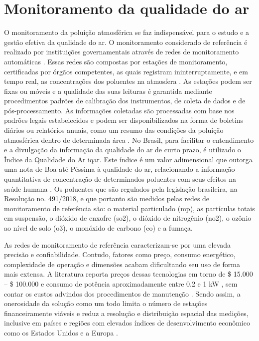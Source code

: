 \chapter{Monitoramento da qualidade do ar}\label{cap:air-quality-monitoring}

O monitoramento da poluição atmosférica se faz indispensável para o estudo e a gestão efetiva da qualidade do ar. O monitoramento considerado de referência é realizado por instituições governamentais através de redes de monitoramento automáticas \cite{Franca2019GUIAAR}. Essas redes são compostas por estações de monitoramento, certificadas por órgãos competentes, as quais registram ininterruptamente, e em tempo real, as concentrações dos poluentes na atmosfera \cite*{CETESB2020RedesAr}. As estações podem ser fixas ou móveis e a qualidade das suas leituras é garantida mediante procedimentos padrões de calibração dos instrumentos, de coleta de dados e de pós-processamento. As informações coletadas são processadas com base nos padrões legais estabelecidos e podem ser disponibilizados na forma de boletins diários ou relatórios anuais, como um resumo das condições da poluição atmosférica dentro de determinada área \cite{CETESB2020RedesAr}. No Brasil, para facilitar o entendimento e a divulgação da informação da qualidade do ar de curto prazo, é utilizado o Índice da Qualidade do Ar \gls{iqar}. Este índice é um valor adimensional que outorga uma nota de Boa até Péssima à qualidade do ar, relacionando a informação quantitativa de concentração de determinados poluentes com seus efeitos na saúde humana \cite{Franca2019GUIAAR}. Os poluentes que são regulados pela legislação brasileira, na Resolução no. 491/2018, e que portanto são medidos pelas redes de monitoramento de referência são: o material particulado (\acrshort{mp}), as partículas totais em suspensão, o dióxido de enxofre (\acrshort{so2}), o dióxido de nitrogênio (\acrshort{no2}), o ozônio ao nível de solo (\acrshort{o3}), o monóxido de carbono (\acrshort{co}) e a fumaça.

As redes de monitoramento de referência caracterizam-se por uma elevada precisão e confiabilidade. Contudo, fatores como preço, consumo energético, complexidade de operação e dimensões acabam dificultando seu uso de forma mais extensa. A literatura reporta preços dessas tecnologias em torno de \$ 15.000 – \$ 100.000 \cite{Concas2021LOW-COSTPREPRINT} e consumo de potência aproximadamente entre 0.2 e 1 kW \cite{Piedrahita2014TheMonitoring}, sem contar os custos advindos dos procedimentos de manutenção \cite{Kumar2015}. Sendo assim, a onerosidade da solução como um todo limita o número de estações financeiramente viáveis e reduz a resolução e distribuição espacial das medições, inclusive em países e regiões com elevados índices de desenvolvimento econômico como os Estados Unidos e a Europa \cite*{Kumar2015,Jiao2016CommunityStates}.

